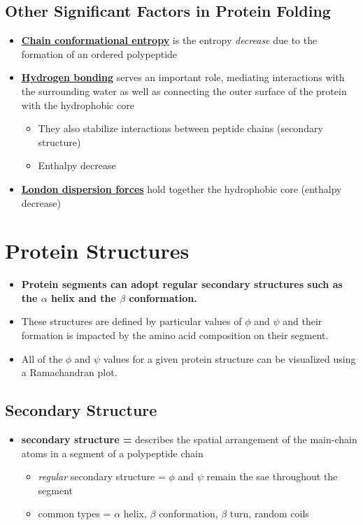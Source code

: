 \documentclass[10pt]{article}
\begin{document}
\subsection*{Other Significant Factors in Protein Folding}
\begin{itemize}
    \item \textbf{\underline{Chain conformational entropy}} is the entropy \textit{decrease} due to the formation of an ordered polypeptide
    \item \textbf{\underline{Hydrogen bonding}} serves an important role, mediating interactions with the surrounding water as well as connecting the outer surface of the protein with the hydrophobic core
    \begin{itemize}
        \item They also stabilize interactions between peptide chains (secondary structure)
        \item Enthalpy decrease
    \end{itemize}
    \item \textbf{\underline{London dispersion forces}} hold together the hydrophobic core (enthalpy decrease)
\end{itemize}




\section*{Protein Structures}
\begin{itemize}
    \item \textbf{Protein segments can adopt regular secondary structures such as the $\alpha$ helix and the $\beta$ conformation.}
    \item These structures are defined by particular values of $\phi$ and $\psi$ and their formation is impacted by the amino acid composition on their segment.
    \item All of the $\phi$ and $\psi$ values for a given protein structure can be visualized using a Ramachandran plot.
\end{itemize}

\subsection*{Secondary Structure}
\begin{itemize}
    \item \textbf{secondary structure =} describes the spatial arrangement of the main-chain atoms in a segment of a polypeptide chain
    \begin{itemize}
        \item \textit{regular} secondary structure = $\phi$ and $\psi$ remain the sae throughout the segment
        \item common types = $\alpha$ helix, $\beta$ conformation, $\beta$ turn, random coils
    \end{itemize}
\end{itemize}
\end{document}
